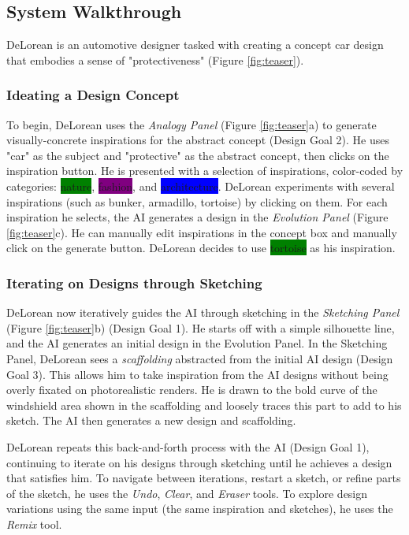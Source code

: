 \documentclass[sigconf, screen]{acmart}
\begin{document}
\subsection{System Walkthrough}

DeLorean is an automotive designer tasked with creating a concept car design that embodies a sense of "protectiveness" (Figure \ref{fig:teaser}).

\subsubsection{Ideating a Design Concept}

To begin, DeLorean uses the \textit{Analogy Panel} (Figure \ref{fig:teaser}a) to generate visually-concrete inspirations for the abstract concept (Design Goal 2). He uses "car" as the subject and "protective" as the abstract concept, then clicks on the inspiration button. He is presented with a selection of inspirations, color-coded by categories: \colorbox{green}{nature}, \colorbox{purple}{fashion}, and \colorbox{blue}{architecture}. DeLorean experiments with several inspirations (such as bunker, armadillo, tortoise) by clicking on them. For each inspiration he selects, the AI generates a design in the \textit{Evolution Panel} (Figure \ref{fig:teaser}c). He can manually edit inspirations in the concept box and manually click on the generate button. DeLorean decides to use \colorbox{green}{tortoise} as his inspiration.

\subsubsection{Iterating on Designs through Sketching}

DeLorean now iteratively guides the AI through sketching in the \textit{Sketching Panel} (Figure \ref{fig:teaser}b) (Design Goal 1). He starts off with a simple silhouette line, and the AI generates an initial design in the Evolution Panel. In the Sketching Panel, DeLorean sees a \textit{scaffolding} abstracted from the initial AI design (Design Goal 3). This allows him to take inspiration from the AI designs without being overly fixated on photorealistic renders. He is drawn to the bold curve of the windshield area shown in the scaffolding and loosely traces this part to add to his sketch. The AI then generates a new design and scaffolding.

DeLorean repeats this back-and-forth process with the AI (Design Goal 1), continuing to iterate on his designs through sketching until he achieves a design that satisfies him. To navigate between iterations, restart a sketch, or refine parts of the sketch, he uses the \textit{Undo}, \textit{Clear}, and \textit{Eraser} tools. To explore design variations using the same input (the same inspiration and sketches), he uses the \textit{Remix} tool.
\end{document}
